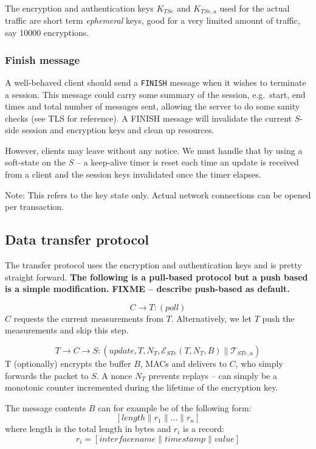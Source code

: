 The encryption and authentication keys $K_{TSe}$ and $K_{TSe,a}$ used for the actual traffic are short term \textit{ephemeral} keys, good for a very limited amount of traffic, say 10000 encryptions.

\subsubsection{Finish message}

A well-behaved client should send a \texttt{FINISH} message when it
wishes to terminate a session. This message could carry some summary
of the session, e.g.\ start, end times and total number of messages
sent, allowing the server to do some sanity checks (see TLS for
reference). A FINISH message will invalidate the current $S$-side
session and encryption keys and clean up resources.

However, clients may leave without any notice. We must handle that by using a soft-state on the $S$ -- a keep-alive timer is reset each time an update is received from a client and the session keys invalidated once the timer elapses.

Note: This refers to the key state only. Actual network connections
can be opened per transaction.

\subsection{Data transfer protocol}

The transfer protocol uses the encryption and authentication keys and
is pretty straight forward. \textbf{The following is a pull-based
  protocol but a push based is a simple modification. FIXME --
  describe push-based as default.}

\[
C \rightarrow T: (\textit{poll})
\]
$C$ requests the current measurements from $T$. Alternatively, we let
$T$ push the measurements and skip this step.

\[
T \rightarrow C \rightarrow S: (\textit{update},T,N_T,\mathcal{E}_{STe}(T,N_T,B) \parallel \mathcal{T}_{STe,a})
\]
T (optionally) encrypts the buffer $B$, MACs and delivers to $C$, who
simply forwards the packet to $S$. A nonce $N_T$ prevents replays --
can simply be a monotonic counter incremented during the lifetime of
the encryption key.

The message contents $B$ can for example be of the following form:
\[
[length \parallel r_1 \parallel \dots \parallel r_n ]
\]
where length is the total length in bytes and $r_i$ is a record:
\[
r_i = [interface name \parallel timestamp \parallel value ]
\]

